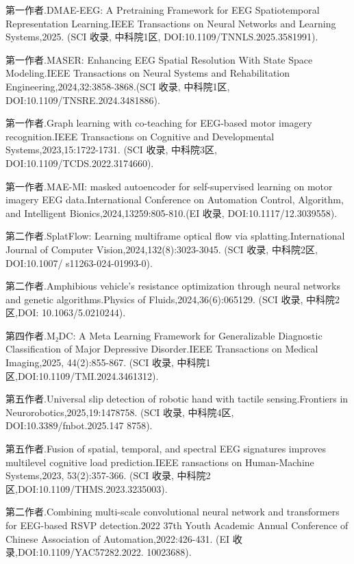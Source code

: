 \begin{resume}
\begin{enumerate}[label={[\arabic*]},labelsep=6pt,topsep=0pt,partopsep=0pt,
        parsep=0pt,itemsep=1pt,leftmargin=0em,itemindent=42pt]
          \item 第一作者.DMAE-EEG: A Pretraining Framework for EEG Spatiotemporal Representation Learning.IEEE Transactions on Neural Networks and Learning Systems,2025. (SCI 收录, 中科院1区, DOI:10.1109/TNNLS.2025.3581991).
          \item 第一作者.MASER: Enhancing EEG Spatial Resolution With State Space Modeling.IEEE Transactions on Neural Systems and Rehabilitation Engineering,2024,32:3858-3868.(SCI 收录, 中科院1区, DOI:10.1109/TNSRE.2024.3481886).
          \item 第一作者.Graph learning with co-teaching for EEG-based motor imagery recognition.IEEE Transactions on Cognitive and Developmental Systems,2023,15:1722-1731. (SCI 收录, 中科院3区, DOI:10.1109/TCDS.2022.3174660).
          \item 第一作者.MAE-MI: masked autoencoder for self-supervised learning on motor imagery EEG data.International Conference on Automation Control, Algorithm, and Intelligent Bionics,2024,13259:805-810.(EI 收录, DOI:10.1117/12.3039558).
          \item 第二作者.SplatFlow: Learning multiframe optical flow via splatting.International Journal of Computer Vision,2024,132(8):3023-3045. (SCI 收录, 中科院2区, DOI:10.1007/ s11263-024-01993-0).
          \item 第二作者.Amphibious vehicle's resistance optimization through neural networks and genetic algorithms.Physics of Fluids,2024,36(6):065129. (SCI 收录, 中科院2区,DOI: 10.1063/5.0210244).
          \item 第四作者.M₂DC: A Meta Learning Framework for Generalizable Diagnostic Classification of Major Depressive Disorder.IEEE Transactions on Medical Imaging,2025, 44(2):855-867. (SCI 收录, 中科院1区,DOI:10.1109/TMI.2024.3461312).
          \item 第五作者.Universal slip detection of robotic hand with tactile sensing.Frontiers in Neurorobotics,2025,19:1478758. (SCI 收录, 中科院4区, DOI:10.3389/fnbot.2025.147 8758).
          \item 第五作者.Fusion of spatial, temporal, and spectral EEG signatures improves multilevel cognitive load prediction.IEEE ransactions on Human-Machine Systems,2023, 53(2):357-366. (SCI 收录, 中科院2区,DOI:10.1109/THMS.2023.3235003).
          \item 第二作者.Combining multi-scale convolutional neural network and transformers for EEG-based RSVP detection.2022 37th Youth Academic Annual Conference of Chinese Association of Automation,2022:426-431. (EI 收录,DOI:10.1109/YAC57282.2022. 10023688).

\end{enumerate}
\end{resume}
